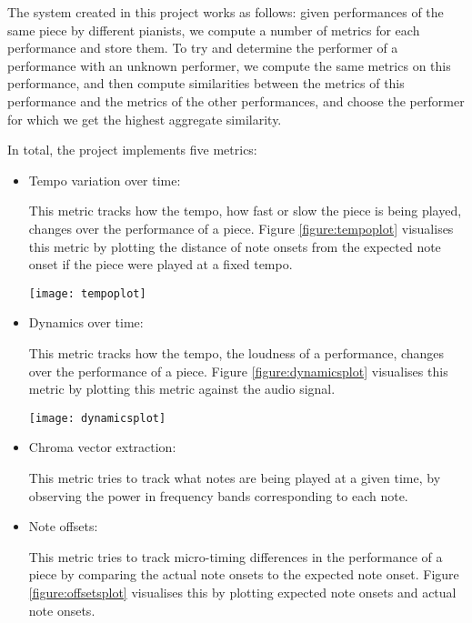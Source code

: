 \documentclass[oneside, class=book, crop=false, 12pt]{standalone}
\begin{document}
The system created in this project works as follows: given performances of the same piece by different pianists, we compute a number of metrics for each performance and store them. To try and determine the performer of a performance with an unknown performer, we compute the same metrics on this performance, and then compute similarities between the metrics of this performance and the metrics of the other performances, and choose the performer for which we get the highest aggregate similarity.

In total, the project implements five metrics:

\begin{itemize}
  \item
    Tempo variation over time:

    This metric tracks how the tempo, how fast or slow the piece is being played, changes over the performance of a piece. Figure \ref{figure:tempoplot} visualises this metric by plotting the distance of note onsets from the expected note onset if the piece were played at a fixed tempo.

\begin{minipage}{\textwidth}
  \centering
  \texttt{[image: tempoplot]}
  \label{figure:tempoplot}
\end{minipage}

  \item
    Dynamics over time:

    This metric tracks how the tempo, the loudness of a performance, changes over the performance of a piece. Figure \ref{figure:dynamicsplot} visualises this metric by plotting this metric against the audio signal.

\begin{minipage}{\textwidth}
  \centering
  \texttt{[image: dynamicsplot]}
  \label{figure:dynamicsplot}
\end{minipage}


  \item
    Chroma vector extraction:

    This metric tries to track what notes are being played at a given time, by observing the power in frequency bands corresponding to each note.

  \item
    Note offsets:

    This metric tries to track micro-timing differences in the performance of a piece by comparing the actual note onsets to the expected note onset. Figure \ref{figure:offsetsplot} visualises this by plotting expected note onsets and actual note onsets.


\end{itemize}
\end{document}
